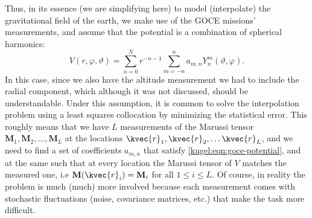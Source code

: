 Thus, in its essence (we are simplifying here) to model (interpolate) the
gravitational field of the earth, we make use of the GOCE missions'
measurements, and assume that the potential is a combination of spherical
harmonics:
\begin{equation}
  \label{kugel:eqn:goce-potential}
  V(r,\varphi,\vartheta)
  = \sum_{n=0}^N r^{-n -1} \sum_{m=-n}^n
    a_{m,n} Y^m_n (\vartheta, \varphi).
\end{equation}
In this case, since we also have the altitude measurement we had to include the
radial component, which although it was not discussed, should be understandable.
Under this assumption, it is common to solve the interpolation problem using a
least squares collocation by minimizing the statistical error. This roughly
means that we have $L$ measurements of the Marussi tensor $\mathbf{M}_1,
\mathbf{M}_2, \ldots, \mathbf{M}_L$ at the locations $\kvec{r}_1, \kvec{r}_2,
\ldots \kvec{r}_L$, and we need to find a set of coefficients $a_{m,n}$ that
satisfy \eqref{kugel:eqn:goce-potential}, and at the same such that at every
location the Marussi tensor of $V$ matches the measured one, i.e
$\mathbf{M}(\kvec{r}_i) = \mathbf{M}_i$ for all $1 \leq i \leq L$. Of course, in
reality the problem is much (much) more involved because each measurement comes
with stochastic fluctuations (noise, covariance matrices, etc.) that make the
task more difficult.
